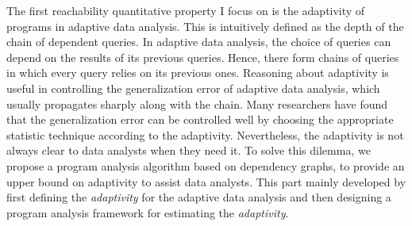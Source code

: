 The first reachability quantitative property
 I focus on is the adaptivity of programs in adaptive data analysis.
 This is intuitively defined as the depth of the chain of dependent queries. 
 In adaptive data analysis, the choice of queries can depend on the results of its previous queries. 
 Hence, there form chains of queries in which every query relies on its previous ones.
 Reasoning about adaptivity is useful in controlling the generalization error of adaptive data analysis, which usually propagates sharply along with the chain. 
 Many researchers have found that the generalization error can be controlled well by choosing the appropriate statistic technique according to the adaptivity. Nevertheless, the adaptivity is not always clear to data analysts when they need it. To solve this dilemma, we propose a program analysis algorithm based on dependency graphs, to provide an upper bound on adaptivity to assist data analysts.
This part mainly developed by first defining the \emph{adaptivity} for 
 the adaptive data analysis
 and then designing
 a program analysis framework for estimating the \emph{adaptivity}.



